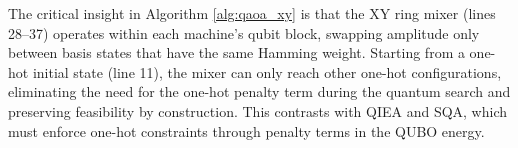 
The critical insight in Algorithm \ref{alg:qaoa_xy}  is that the XY ring mixer (lines 28–37) operates within each machine's qubit block, swapping amplitude only between basis states that have the same Hamming weight. Starting from a one-hot initial state (line 11), the mixer can only reach other one-hot configurations, eliminating the need for the one-hot penalty term during the quantum search and preserving feasibility by construction. This contrasts with QIEA and SQA, which must enforce one-hot constraints through penalty terms in the QUBO energy.

